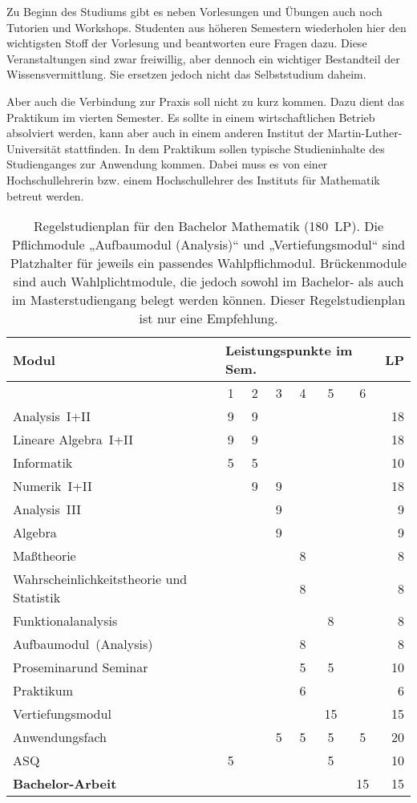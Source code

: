 Zu Beginn des Studiums gibt es neben Vorlesungen und Übungen auch noch Tutorien und Workshops.
Studenten aus höheren Semestern wiederholen hier den wichtigsten Stoff der Vorlesung und beantworten eure Fragen dazu. Diese Veranstaltungen sind zwar freiwillig, aber dennoch ein wichtiger Bestandteil der Wissensvermittlung. Sie ersetzen jedoch nicht das Selbststudium daheim. 

Aber auch die Verbindung zur Praxis soll nicht zu kurz kommen. Dazu dient das Praktikum im vierten Semester.
Es sollte in einem wirtschaftlichen Betrieb absolviert werden, kann aber auch in einem anderen Institut der Martin-Luther-Universität stattfinden.
In dem Praktikum sollen typische Studieninhalte des Studienganges zur Anwendung kommen.
Dabei muss es von einer Hochschullehrerin bzw. einem Hochschullehrer des Instituts für Mathematik betreut werden.

\begin{table}[tbp]
	\begin{small}
		\begin{tabularx}{\textwidth}{|X||c|c|c|c|c|c||r|}
			\hline
			\textbf{Modul}&\multicolumn{6}{l||}{\textbf{Leistungspunkte im Sem.}}&\textbf{LP}\\\hline
			&1&2&3&4&5&6&\\\hline\hline
			Analysis~I+II&9&9&&&&&18\\\hline
			Lineare Algebra~I+II&9&9&&&&&18\\\hline
			Informatik&5&5&&&&&10\\\hline
			Numerik~I+II&&9&9&&&&18\\\hline
			Analysis~III&&&9&&&&9\\\hline
			Algebra&&&9&&&&9\\\hline
			Maßtheorie&&&&8&&&8\\\hline
			Wahrscheinlichkeitstheorie und Statistik&&&&8&&&8\\\hline
			Funktionalanalysis&&&&&8&&8\\\hline
			Aufbaumodul~(Analysis)&&&&8&&&8\\\hline
			Proseminarund Seminar&&&&5&5&&10\\\hline
			Praktikum&&&&6&&&6\\\hline
			Vertiefungsmodul&&&&&15&&15\\\hline
			Anwendungsfach&&&5&5&5&5&20\\\hline
			ASQ&5&&&&5&&10\\\hline\hline
			\textbf{Bachelor-Arbeit}&&&&&&15&15\\\hline
		\end{tabularx}
	\end{small}
	\caption{\label{plan-mathe}Regelstudienplan für den Bachelor Mathematik (180~LP). Die Pflichmodule „Aufbaumodul (Analysis)“ und „Vertiefungsmodul“ sind Platzhalter für jeweils ein passendes Wahlpflichmodul. Brückenmodule sind auch Wahlplichtmodule, die jedoch sowohl im Bachelor- als auch im Masterstudiengang belegt werden können. Dieser Regelstudienplan ist nur eine Empfehlung.}
\end{table}

